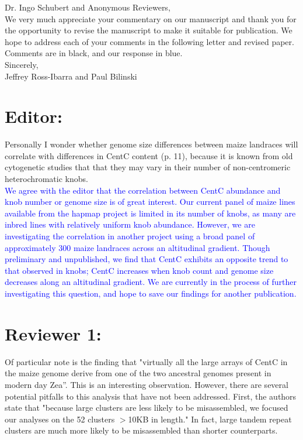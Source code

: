 \documentclass[]{article}
\newcommand{\res}[1]{\noindent \textcolor{blue}{{#1}} \\}
\begin{document}
\noindent Dr. Ingo Schubert and Anonymous Reviewers, \\

We very much appreciate your commentary on our manuscript and thank you for the opportunity to revise the manuscript to make it suitable for publication.  
We hope to address each of your comments in the following letter and revised paper. Comments are in black, and our response in blue.\\

\noindent Sincerely,\\

\noindent Jeffrey Ross-Ibarra and Paul Bilinski

\section*{Editor:}

Personally I wonder whether genome size differences between maize landraces will correlate with differences in CentC content (p. 11), because it is known from old cytogenetic studies that that they may vary in their number of non-centromeric heterochromatic knobs. \\

\res{We agree with the editor that the correlation between CentC abundance and knob number or genome size is of great interest. 
 Our current panel of maize lines available from the hapmap project is limited in its number of knobs, as many are inbred lines with relatively uniform knob abundance.  
However, we are investigating the correlation in another project using a broad panel of approximately 300 maize landraces across an altitudinal gradient.  
Though preliminary and unpublished, we find that CentC exhibits an opposite trend to that observed in knobs; CentC increases when knob count and genome size decreases along an altitudinal gradient.  
We are currently in the process of further investigating this question, and hope to save our findings for another publication.}

\section*{Reviewer 1:}

Of particular note is the finding that "virtually all the large arrays of CentC in the maize genome derive from one of the two ancestral genomes present in modern day Zea”.  This is an interesting observation.  However, there are several potential pitfalls to this analysis that have not been addressed.  First, the authors state that "because large clusters are less likely to be misassembled, we focused our analyses on the 52 clusters $>$10KB in length."  In fact, large tandem repeat clusters are much more likely to be misassembled than shorter counterparts. \\
\end{document}

